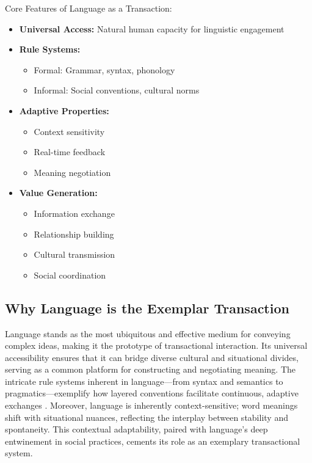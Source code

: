 \documentclass[12pt]{article}
\begin{document}
\begin{tcolorbox}[featurebox, title=Language Features]
Core Features of Language as a Transaction:
\begin{itemize}[label=$\bullet$]
\item \textbf{Universal Access:} Natural human capacity for linguistic engagement
\item \textbf{Rule Systems:}
  \begin{itemize}
  \item Formal: Grammar, syntax, phonology
  \item Informal: Social conventions, cultural norms
  \end{itemize}
\item \textbf{Adaptive Properties:}
  \begin{itemize}
  \item Context sensitivity
  \item Real-time feedback
  \item Meaning negotiation
  \end{itemize}
\item \textbf{Value Generation:}
  \begin{itemize}
  \item Information exchange
  \item Relationship building
  \item Cultural transmission
  \item Social coordination
  \end{itemize}
\end{itemize}
\end{tcolorbox}

\subsection{Why Language is the Exemplar Transaction}

Language stands as the most ubiquitous and effective medium for conveying complex ideas, making it the prototype of transactional interaction. Its universal accessibility ensures that it can bridge diverse cultural and situational divides, serving as a common platform for constructing and negotiating meaning. The intricate rule systems inherent in language---from syntax and semantics to pragmatics---exemplify how layered conventions facilitate continuous, adaptive exchanges \parencite{wittgenstein1953philosophical}. Moreover, language is inherently context-sensitive; word meanings shift with situational nuances, reflecting the interplay between stability and spontaneity. This contextual adaptability, paired with language's deep entwinement in social practices, cements its role as an exemplary transactional system.
\end{document}
